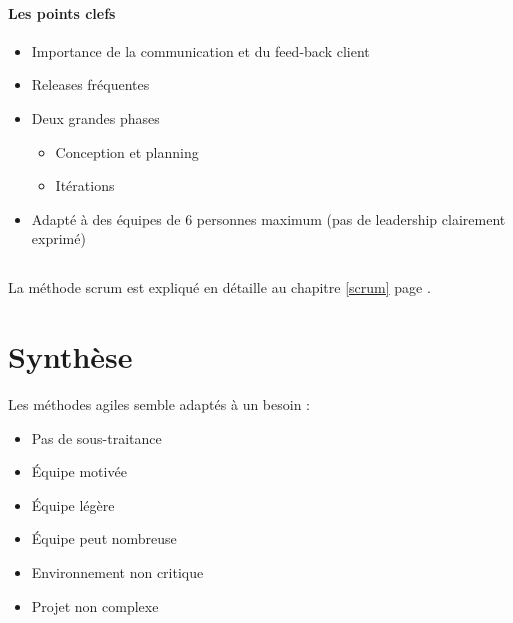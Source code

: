 	\paragraph{Les points clefs}
	\begin{itemize}
		\item Importance de la communication et du feed-back client
		\item Releases fréquentes
		\item Deux grandes phases
			\begin{itemize}
				\item Conception et planning
				\item Itérations
			\end{itemize}
		\item Adapté à des équipes de 6 personnes maximum (pas de leadership clairement exprimé)
	\end{itemize}
	\subsection{}
	La méthode scrum est expliqué en détaille au chapitre \ref{scrum} page \pageref{scrum}. 
	\section{Synthèse}
		Les méthodes agiles semble adaptés à un besoin : 
		\begin{itemize}
			\item Pas de sous-traitance
			\item Équipe motivée
			\item Équipe légère
			\item Équipe peut nombreuse
			\item Environnement non critique
			\item Projet non complexe
		\end{itemize}
